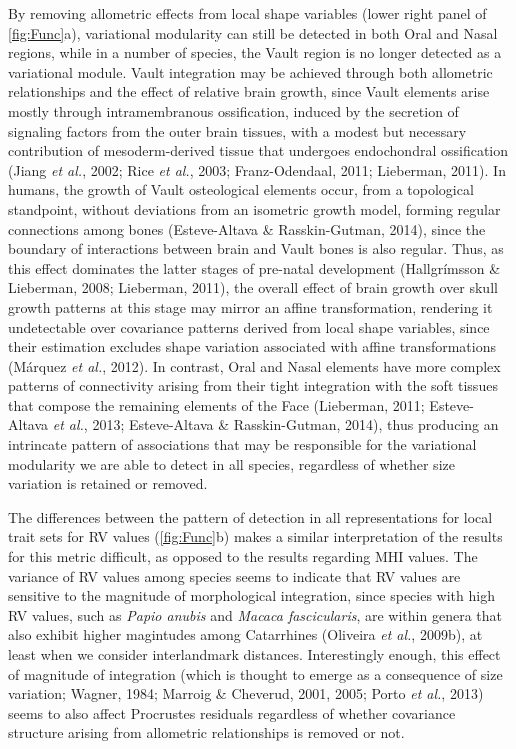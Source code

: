 \documentclass[12pt,twoside]{report}
\begin{document}
By removing allometric effects from local shape variables (lower right
panel of \autoref{fig:Func}a), variational modularity can still be
detected in both Oral and Nasal regions, while in a number of species,
the Vault region is no longer detected as a variational module. Vault
integration may be achieved through both allometric relationships and
the effect of relative brain growth, since Vault elements arise mostly
through intramembranous ossification, induced by the secretion of
signaling factors from the outer brain tissues, with a modest but
necessary contribution of mesoderm-derived tissue that undergoes
endochondral ossification (Jiang \emph{et al.}, 2002; Rice \emph{et
al.}, 2003; Franz-Odendaal, 2011; Lieberman, 2011). In humans, the
growth of Vault osteological elements occur, from a topological
standpoint, without deviations from an isometric growth model, forming
regular connections among bones (Esteve-Altava \& Rasskin-Gutman, 2014),
since the boundary of interactions between brain and Vault bones is also
regular. Thus, as this effect dominates the latter stages of pre-natal
development (Hallgrímsson \& Lieberman, 2008; Lieberman, 2011), the
overall effect of brain growth over skull growth patterns at this stage
may mirror an affine transformation, rendering it undetectable over
covariance patterns derived from local shape variables, since their
estimation excludes shape variation associated with affine
transformations (Márquez \emph{et al.}, 2012). In contrast, Oral and
Nasal elements have more complex patterns of connectivity arising from
their tight integration with the soft tissues that compose the remaining
elements of the Face (Lieberman, 2011; Esteve-Altava \emph{et al.},
2013; Esteve-Altava \& Rasskin-Gutman, 2014), thus producing an
intrincate pattern of associations that may be responsible for the
variational modularity we are able to detect in all species, regardless
of whether size variation is retained or removed.

The differences between the pattern of detection in all representations
for local trait sets for RV values (\autoref{fig:Func}b) makes a similar
interpretation of the results for this metric difficult, as opposed to
the results regarding MHI values. The variance of RV values among
species seems to indicate that RV values are sensitive to the magnitude
of morphological integration, since species with high RV values, such as
\emph{Papio anubis} and \emph{Macaca fascicularis}, are within genera
that also exhibit higher magintudes among Catarrhines (Oliveira \emph{et
al.}, 2009b), at least when we consider interlandmark distances.
Interestingly enough, this effect of magnitude of integration (which is
thought to emerge as a consequence of size variation; Wagner, 1984;
Marroig \& Cheverud, 2001, 2005; Porto \emph{et al.}, 2013) seems to
also affect Procrustes residuals regardless of whether covariance
structure arising from allometric relationships is removed or not.
\end{document}
